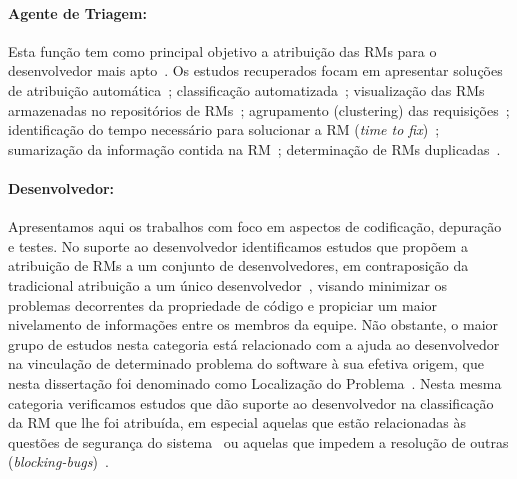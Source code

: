 \paragraph{Agente de Triagem:}

Esta função tem como principal objetivo a atribuição das RMs para o
desenvolvedor mais apto~\cite{banitaan2013decoba}.  Os estudos recuperados
focam em apresentar soluções de atribuição automática~\cite{banitaan2013decoba,
    shokripour2012automatic, somasundaram2012automatic, Naguib2013, Zhang2014,
    Zanetti2013}; classificação
automatizada~\cite{gegick2010identifying,liu2014faceted, behl2014bug,
    chawla2015automated,tian2015automated}; visualização das RMs armazenadas no
repositórios de RMs~\cite{izquierdo2015gila}; agrupamento (clustering) das
requisições~\cite{liu2014faceted}; identificação do tempo necessário para
solucionar a RM (\textit{time to fix})~\cite{hosseini2012market,
    Bhattacharya:2011:BTP:1985441.1985472}; sumarização da informação contida
na RM~\cite{mani2012ausum}; determinação de RMs duplicadas~\cite{Sun2011,
    Wu2011a}.

\paragraph{Desenvolvedor:}

Apresentamos aqui os trabalhos com foco em aspectos de co\-di\-fi\-ca\-ção,
depuração e testes. No suporte ao desenvolvedor identificamos estudos que
propõem a atribuição de RMs a um conjunto de desenvolvedores, em contraposição
da tradicional atribuição a um único desenvolvedor~\cite{banitaan2013decoba},
visando minimizar os pro\-ble\-mas decorrentes da propriedade de código e
propiciar um maior nivelamento de informações entre os membros da equipe. Não
obstante, o maior grupo de estudos nesta categoria está relacionado com a ajuda
ao desenvolvedor na vinculação de determinado problema do software à sua efetiva
origem, que nesta dissertação foi denominado como Localização do
Problema~\cite{corley2011recovering,Wong:2014:BBF:2705615.2706096,
    Thung:2014:BIT:2635868.2661678,Nguyen:2012:MAR:2393596.2393671,thung2013automatic,
    Romo:2015:TAT:2745802.2745833}. Nesta mesma categoria verificamos estudos
que dão suporte ao desenvolvedor na classificação da RM que lhe foi atribuída,
em especial aquelas que estão relacionadas às questões de segurança do
sistema~\cite{gegick2010identifying} ou aquelas que impedem a resolução de
outras (\textit{blocking-bugs})~\cite{ValdiviaGarcia:2014:CPB:2597073.2597099}.

